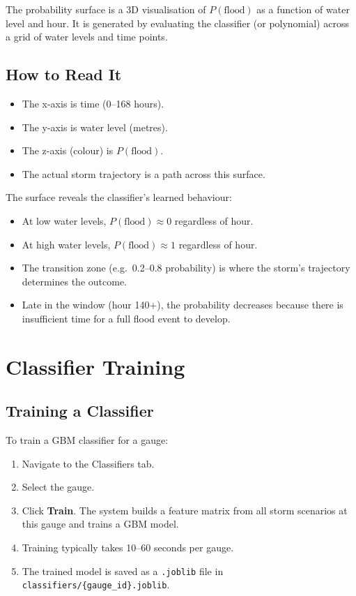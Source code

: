 \documentclass[11pt,a4paper]{article}
\begin{document}
The probability surface is a 3D visualisation of $P(\text{flood})$ as
a function of water level and hour.  It is generated by evaluating the
classifier (or polynomial) across a grid of water levels and time
points.

\subsection{How to Read It}

\begin{itemize}
  \item The x-axis is time (0--168 hours).
  \item The y-axis is water level (metres).
  \item The z-axis (colour) is $P(\text{flood})$.
  \item The actual storm trajectory is a path across this surface.
\end{itemize}

\noindent The surface reveals the classifier's learned behaviour:
\begin{itemize}
  \item At low water levels, $P(\text{flood}) \approx 0$ regardless
        of hour.
  \item At high water levels, $P(\text{flood}) \approx 1$ regardless
        of hour.
  \item The transition zone (e.g.\ 0.2--0.8 probability) is where
        the storm's trajectory determines the outcome.
  \item Late in the window (hour 140+), the probability decreases
        because there is insufficient time for a full flood event to
        develop.
\end{itemize}


\section{Classifier Training}

\subsection{Training a Classifier}

To train a GBM classifier for a gauge:
\begin{enumerate}
  \item Navigate to the Classifiers tab.
  \item Select the gauge.
  \item Click \textbf{Train}.  The system builds a feature matrix from
        all storm scenarios at this gauge and trains a GBM model.
  \item Training typically takes 10--60 seconds per gauge.
  \item The trained model is saved as a \texttt{.joblib} file in
        \texttt{classifiers/\{gauge\_id\}.joblib}.
\end{enumerate}
\end{document}
